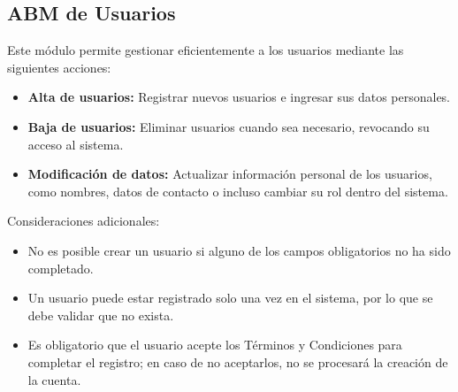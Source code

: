 \documentclass[a4paper,12pt]{article}
\begin{document}
    \subsection{ABM de Usuarios}
    \par Este módulo permite gestionar eficientemente a los usuarios mediante las siguientes acciones:
    \begin{itemize}
        \item \textbf{Alta de usuarios:} Registrar nuevos usuarios e ingresar sus datos personales.
        \item \textbf{Baja de usuarios:} Eliminar usuarios cuando sea necesario, revocando su acceso al sistema.
        \item \textbf{Modificación de datos:} Actualizar información personal de los usuarios, como nombres, datos de contacto o incluso cambiar su rol dentro del sistema.
    \end{itemize}
    \par Consideraciones adicionales:
    \begin{itemize}
        \item No es posible crear un usuario si alguno de los campos obligatorios no ha sido completado.
        \item Un usuario puede estar registrado solo una vez en el sistema, por lo que se debe validar que no exista.
        \item Es obligatorio que el usuario acepte los Términos y Condiciones para completar el registro; en caso de no aceptarlos, no se procesará la creación de la cuenta.
    \end{itemize}
\end{document}
